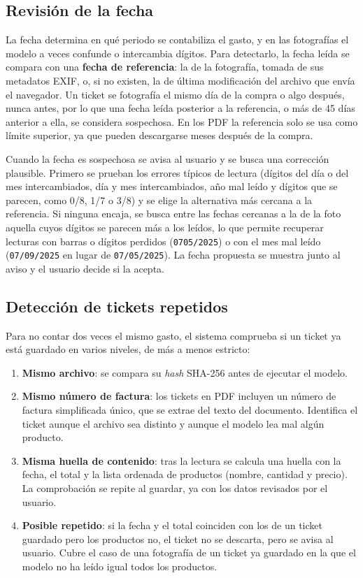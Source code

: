 \subsection{Revisión de la fecha}
\label{s:revision-fecha}
La fecha determina en qué periodo se contabiliza el gasto, y en las fotografías el modelo a veces confunde o intercambia dígitos. Para detectarlo, la fecha leída se compara con una \textbf{fecha de referencia}: la de la fotografía, tomada de sus metadatos EXIF, o, si no existen, la de última modificación del archivo que envía el navegador. Un ticket se fotografía el mismo día de la compra o algo después, nunca antes, por lo que una fecha leída posterior a la referencia, o más de 45 días anterior a ella, se considera sospechosa. En los PDF la referencia solo se usa como límite superior, ya que pueden descargarse meses después de la compra.

Cuando la fecha es sospechosa se avisa al usuario y se busca una corrección plausible. Primero se prueban los errores típicos de lectura (dígitos del día o del mes intercambiados, día y mes intercambiados, año mal leído y dígitos que se parecen, como 0/8, 1/7 o 3/8) y se elige la alternativa más cercana a la referencia. Si ninguna encaja, se busca entre las fechas cercanas a la de la foto aquella cuyos dígitos se parecen más a los leídos, lo que permite recuperar lecturas con barras o dígitos perdidos (\texttt{0705/2025}) o con el mes mal leído (\texttt{07/09/2025} en lugar de \texttt{07/05/2025}). La fecha propuesta se muestra junto al aviso y el usuario decide si la acepta.

\subsection{Detección de tickets repetidos}
\label{s:repetidos}
Para no contar dos veces el mismo gasto, el sistema comprueba si un ticket ya está guardado en varios niveles, de más a menos estricto:

\begin{enumerate}
    \item \textbf{Mismo archivo}: se compara su \textit{hash} SHA-256 antes de ejecutar el modelo.
    \item \textbf{Mismo número de factura}: los tickets en PDF incluyen un número de factura simplificada único, que se extrae del texto del documento. Identifica el ticket aunque el archivo sea distinto y aunque el modelo lea mal algún producto.
    \item \textbf{Misma huella de contenido}: tras la lectura se calcula una huella con la fecha, el total y la lista ordenada de productos (nombre, cantidad y precio). La comprobación se repite al guardar, ya con los datos revisados por el usuario.
    \item \textbf{Posible repetido}: si la fecha y el total coinciden con los de un ticket guardado pero los productos no, el ticket no se descarta, pero se avisa al usuario. Cubre el caso de una fotografía de un ticket ya guardado en la que el modelo no ha leído igual todos los productos.
\end{enumerate}

